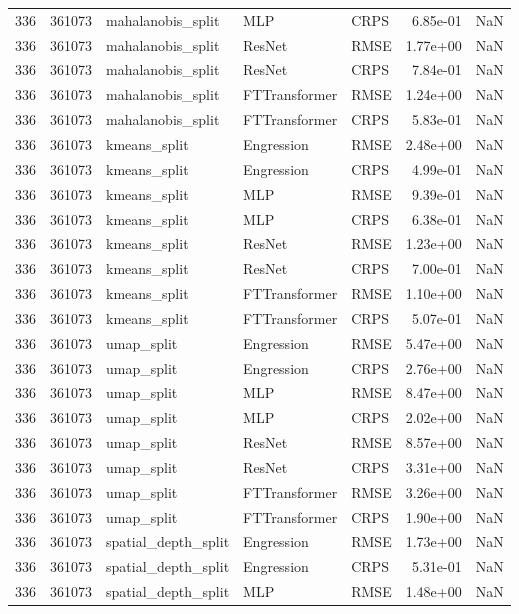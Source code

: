 \begin{tabular}{rrlllrr}
336 & 361073 & mahalanobis\_split & MLP & CRPS & 6.85e-01 & NaN \\
336 & 361073 & mahalanobis\_split & ResNet & RMSE & 1.77e+00 & NaN \\
336 & 361073 & mahalanobis\_split & ResNet & CRPS & 7.84e-01 & NaN \\
336 & 361073 & mahalanobis\_split & FTTransformer & RMSE & 1.24e+00 & NaN \\
336 & 361073 & mahalanobis\_split & FTTransformer & CRPS & 5.83e-01 & NaN \\
336 & 361073 & kmeans\_split & Engression & RMSE & 2.48e+00 & NaN \\
336 & 361073 & kmeans\_split & Engression & CRPS & 4.99e-01 & NaN \\
336 & 361073 & kmeans\_split & MLP & RMSE & 9.39e-01 & NaN \\
336 & 361073 & kmeans\_split & MLP & CRPS & 6.38e-01 & NaN \\
336 & 361073 & kmeans\_split & ResNet & RMSE & 1.23e+00 & NaN \\
336 & 361073 & kmeans\_split & ResNet & CRPS & 7.00e-01 & NaN \\
336 & 361073 & kmeans\_split & FTTransformer & RMSE & 1.10e+00 & NaN \\
336 & 361073 & kmeans\_split & FTTransformer & CRPS & 5.07e-01 & NaN \\
336 & 361073 & umap\_split & Engression & RMSE & 5.47e+00 & NaN \\
336 & 361073 & umap\_split & Engression & CRPS & 2.76e+00 & NaN \\
336 & 361073 & umap\_split & MLP & RMSE & 8.47e+00 & NaN \\
336 & 361073 & umap\_split & MLP & CRPS & 2.02e+00 & NaN \\
336 & 361073 & umap\_split & ResNet & RMSE & 8.57e+00 & NaN \\
336 & 361073 & umap\_split & ResNet & CRPS & 3.31e+00 & NaN \\
336 & 361073 & umap\_split & FTTransformer & RMSE & 3.26e+00 & NaN \\
336 & 361073 & umap\_split & FTTransformer & CRPS & 1.90e+00 & NaN \\
336 & 361073 & spatial\_depth\_split & Engression & RMSE & 1.73e+00 & NaN \\
336 & 361073 & spatial\_depth\_split & Engression & CRPS & 5.31e-01 & NaN \\
336 & 361073 & spatial\_depth\_split & MLP & RMSE & 1.48e+00 & NaN \\

\end{tabular}
